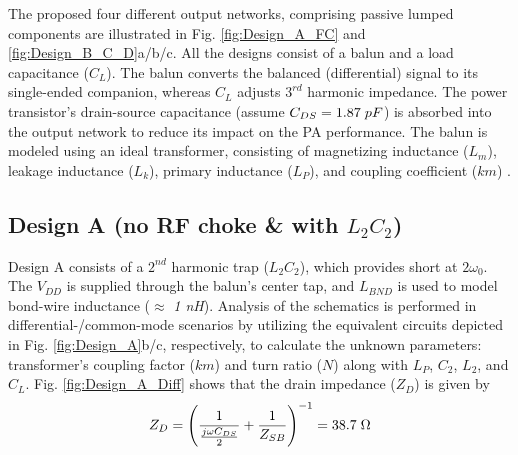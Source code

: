 \documentclass[conference]{IEEEtran}
\begin{document}
The proposed four different  output networks, comprising passive lumped components are illustrated in Fig. \ref{fig:Design_A_FC} and \ref{fig:Design_B_C_D}a/b/c. 
All the designs consist of a balun and a load capacitance ($C_L$). The balun converts the balanced (differential) signal to its single-ended companion, whereas $C_L$ adjusts $3^{rd}$ harmonic impedance. The power transistor's drain-source capacitance (assume $C_{DS}=1.87\hspace{1mm}pF$) is absorbed into the output network to reduce its impact on the PA performance. The balun is modeled using an ideal transformer, consisting of magnetizing inductance ($L_m$), leakage inductance ($L_k$), primary inductance ($L_P$), and coupling coefficient ($km$) \cite{Transformer_model}. 

\subsection{Design A (no RF choke \& with $L_2C_2$)}
Design A consists of a $2^{nd}$ harmonic trap ($L_2C_2$), which provides short at $2\omega_0$. The $V_{DD}$ is supplied through the balun's center tap, and $L_{BND}$ is used to model bond-wire inductance ($\approx$ \textit{1 nH}). Analysis of the schematics is performed in differential-/common-mode scenarios by utilizing the equivalent circuits depicted in Fig. \ref{fig:Design_A}b/c, respectively, to calculate the unknown parameters: transformer's coupling factor ($km$) and turn ratio ($N$) along with  $L_P$, $C_2$, $L_2$, and $C_L$. Fig. \ref{fig:Design_A_Diff} shows that the drain impedance ($Z_D$) is given by
\vspace{-0.05in}
\begin{equation}
	Z_D=\left(\frac{1}{\frac{j\omega C_{DS}}{2}}+\frac{1}{Z_{SB}}\right)^{-1}=38.7 \hspace{1mm} \Omega
	\label{eqn:ZD}
\end{equation}
\end{document}
